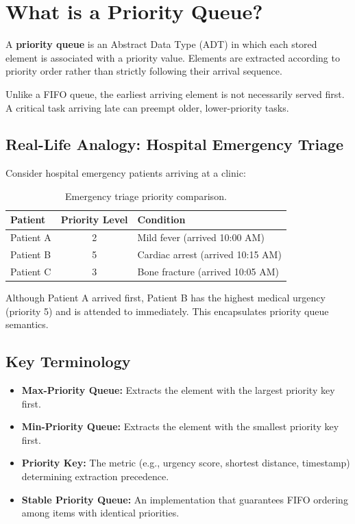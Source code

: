 \section{What is a Priority Queue?}

A \textbf{priority queue} is an Abstract Data Type (ADT) in which each stored element is associated with a priority value. Elements are extracted according to priority order rather than strictly following their arrival sequence.

Unlike a FIFO queue, the earliest arriving element is not necessarily served first. A critical task arriving late can preempt older, lower-priority tasks.

\subsection{Real-Life Analogy: Hospital Emergency Triage}
Consider hospital emergency patients arriving at a clinic:
\begin{table}[htbp]
\centering
\small
\begin{tabularx}{0.85\textwidth}{l c X}
\toprule
\textbf{Patient} & \textbf{Priority Level} & \textbf{Condition} \\
\midrule
Patient A & 2 & Mild fever (arrived 10:00 AM) \\
Patient B & 5 & Cardiac arrest (arrived 10:15 AM) \\
Patient C & 3 & Bone fracture (arrived 10:05 AM) \\
\bottomrule
\end{tabularx}
\caption{Emergency triage priority comparison.}
\end{table}
Although Patient A arrived first, Patient B has the highest medical urgency (priority 5) and is attended to immediately. This encapsulates priority queue semantics.

\subsection{Key Terminology}
\begin{itemize}
    \item \textbf{Max-Priority Queue:} Extracts the element with the largest priority key first.
    \item \textbf{Min-Priority Queue:} Extracts the element with the smallest priority key first.
    \item \textbf{Priority Key:} The metric (e.g., urgency score, shortest distance, timestamp) determining extraction precedence.
    \item \textbf{Stable Priority Queue:} An implementation that guarantees FIFO ordering among items with identical priorities.
\end{itemize}

